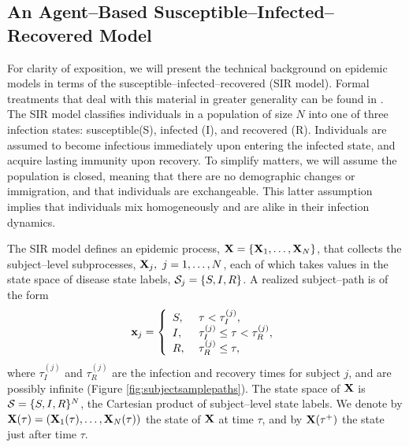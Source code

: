 \subsection{An Agent--Based Susceptible--Infected--Recovered Model}
\label{subsec:sir_individual_mod}
For clarity of exposition, we will present the technical background on epidemic models in terms of the susceptible--infected--recovered (SIR model). Formal treatments that deal with this material in greater generality can be found in \cite{andersson2000stochastic,britton2018,brauer2008compartmental,fuchs2013inference,wilkinson2011stochastic}. The SIR model classifies individuals in a population of size $ N $ into one of three infection states: susceptible(S), infected (I), and recovered (R). Individuals are assumed to become infectious immediately upon entering the infected state, and acquire lasting immunity upon recovery. To simplify matters, we will assume the population is closed, meaning that there are no demographic changes or immigration, and that individuals are exchangeable. This latter assumption implies that individuals mix homogeneously and are alike in their infection dynamics. 

The SIR model defines an epidemic process, $ \mathbf{X} = \lbrace\mathbf{X}_1,\dots,\mathbf{X}_N\rbrace $, that collects the subject--level subprocesses, $ \mathbf{X}_j,\ j=1,\dots,N $, each of which takes values in the state space of disease state labels, $ \mathcal{S}_j= \lbrace S,I,R\rbrace $. A realized subject--path is of the form 
\begin{equation}
\mathbf{x}_j = \left \lbrace\begin{array}{ll}
S,\ & \tau < \tau_I^{(j)},\\
I,\ & \tau_I^{(j)}\leq\tau<\tau_R^{(j)},\\
R,\ & \tau_R^{(j)} \leq \tau,
\end{array}\right .
\end{equation}
where $ \tau_I^{(j)} $ and $ \tau_{R}^{(j)} $ are the infection and recovery times for subject $ j $, and are possibly infinite (Figure \ref{fig:subjectsamplepaths}). The state space of $ \mathbf{X} $ is  $ \mathcal{S} = \lbrace S,I,R\rbrace^N $, the Cartesian product of subject--level state labels. We denote by $ \mathbf{X}(\tau) = \left (\mathbf{X}_1(\tau),\dots,\mathbf{X}_N(\tau)\right ) $ the state of $ \mathbf{X} $ at time $ \tau $, and by $ \mathbf{X}(\tau^+) $ the state just after time $ \tau $. 

